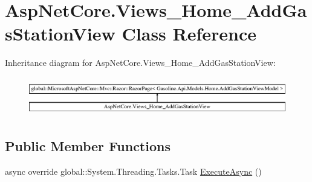 \hypertarget{class_asp_net_core_1_1_views___home___add_gas_station_view}{}\section{Asp\+Net\+Core.\+Views\+\_\+\+Home\+\_\+\+Add\+Gas\+Station\+View Class Reference}
\label{class_asp_net_core_1_1_views___home___add_gas_station_view}
Inheritance diagram for Asp\+Net\+Core.\+Views\+\_\+\+Home\+\_\+\+Add\+Gas\+Station\+View\+:\begin{figure}[H]
\begin{center}
\leavevmode
\includegraphics[height=1.731067cm]{class_asp_net_core_1_1_views___home___add_gas_station_view}
\end{center}
\end{figure}
\subsection*{Public Member Functions}
\begin{DoxyCompactItemize}
\item 
async override global\+::\+System.\+Threading.\+Tasks.\+Task \mbox{\hyperlink{class_asp_net_core_1_1_views___home___add_gas_station_view_a3c8c80d96f17fa7e0cc6887dfd099552}{Execute\+Async}} ()
\end{DoxyCompactItemize}
